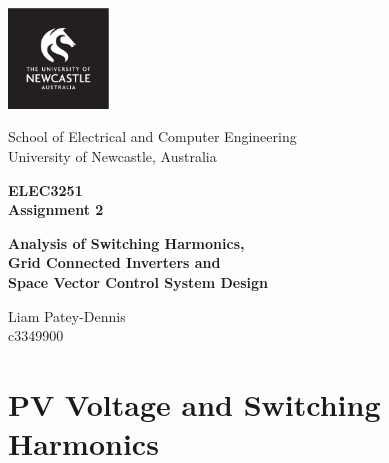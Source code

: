 \documentclass[12pt,twoside]{scrartcl}
\begin{document}
\setcounter{page}{1}
\begin{titlepage}
    \begin{center}

        \includegraphics[width=0.2\textwidth]{LOGO_Square.pdf}

        \vspace*{0.4cm}
        School of Electrical and Computer Engineering \\
        University of Newcastle, Australia
        
        \vspace{1cm}
        \huge
        \textbf{\textsf{ELEC3251 \\ }}
        \vspace{0.2cm}
        \huge
        \textbf{\textsf{Assignment 2}}

        \vspace{0.5cm}
        \large
        \textbf{\textsf{Analysis of Switching Harmonics, \\ 
                        Grid Connected Inverters and \\ 
                        Space Vector Control System Design
                        }}

        \vspace{1.5cm}
        \normalsize
        Liam Patey-Dennis \\
        c3349900
        \vfill    
    \end{center}
\end{titlepage}


\section{PV Voltage and Switching Harmonics}
\end{document}

